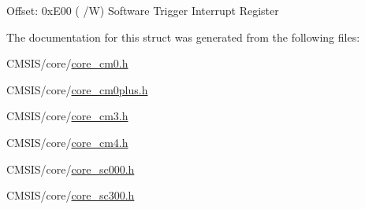 Offset\+: 0x\+E00 ( /W) Software Trigger Interrupt Register 

The documentation for this struct was generated from the following files\+:\begin{DoxyCompactItemize}
\item 
C\+M\+S\+I\+S/core/\mbox{\hyperlink{core__cm0_8h}{core\+\_\+cm0.\+h}}\item 
C\+M\+S\+I\+S/core/\mbox{\hyperlink{core__cm0plus_8h}{core\+\_\+cm0plus.\+h}}\item 
C\+M\+S\+I\+S/core/\mbox{\hyperlink{core__cm3_8h}{core\+\_\+cm3.\+h}}\item 
C\+M\+S\+I\+S/core/\mbox{\hyperlink{core__cm4_8h}{core\+\_\+cm4.\+h}}\item 
C\+M\+S\+I\+S/core/\mbox{\hyperlink{core__sc000_8h}{core\+\_\+sc000.\+h}}\item 
C\+M\+S\+I\+S/core/\mbox{\hyperlink{core__sc300_8h}{core\+\_\+sc300.\+h}}\end{DoxyCompactItemize}
